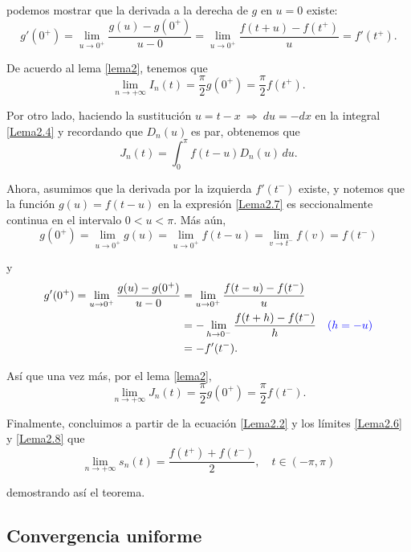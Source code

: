 \begin{demo}
podemos mostrar que la derivada a la derecha de $g$ en  $u = 0$ existe:
\begin{equation*}
    g'(0^+) = \lim_{u \to 0^+} \frac{g(u) - g(0^+)}{u-0} = \lim_{u \to 0^+} \frac{f(t+u) - f(t^+)}{u} = f'(t^+).
\end{equation*}

De acuerdo al lema \ref{lema2}, tenemos que 
\begin{equation}
\lim_{n \to + \infty} I_n(t) = \frac{\pi}{2} g(0^+) = \frac{\pi}{2} f(t^+).    \label{Lema2.6}
\end{equation}

Por otro lado, haciendo la sustitución $u = t-x ~\Rightarrow~ du = -dx$ en la integral \eqref{Lema2.4} y recordando que $D_n(u)$ es par, obtenemos que
\begin{equation}
    J_n(t) = \int_0^{\pi} f(t-u) D_n(u) \,du. \label{Lema2.7}
\end{equation}

Ahora, asumimos que la derivada por la izquierda $f'(t^-)$ existe, y notemos que la función $g(u) = f(t-u)$ en la expresión \eqref{Lema2.7} es seccionalmente continua en el intervalo $0<u<\pi$. Más aún, 
$$g(0^+) = \lim_{u \to 0^+} g(u) = \lim_{u \to 0^+} f(t - u) = \lim_{v \to t^-} f(v) = f(t^-)$$

y
\begin{align*}
g'(0^+) = \lim_{u \to 0^+} \frac{g(u) - g(0^+)}{u-0} &= \lim_{u \to 0^+} \frac{f(t-u) - f(t^-)}{u} \\
&=   - \lim_{h \to 0^-} \frac{f(t+h) - f(t^-)}{h} \quad \textcolor{blue}{(h = -u)}\\
&= -f'(t^-).   
\end{align*}

Así que una vez más, por el lema \ref{lema2}, 
\begin{equation}
\lim_{n \to + \infty} J_n(t) = \frac{\pi}{2} g(0^+) = \frac{\pi}{2} f(t^-).    \label{Lema2.8}
\end{equation}

Finalmente, concluimos a partir de la ecuación \eqref{Lema2.2} y los límites \eqref{Lema2.6} y \eqref{Lema2.8} que 
$$\lim_{n \to + \infty} s_n(t) = \frac{f(t^+) + f(t^-)}{2}, \quad t \in (-\pi,\pi)$$

demostrando así el teorema.
\end{demo}

\subsection*{Convergencia uniforme}

